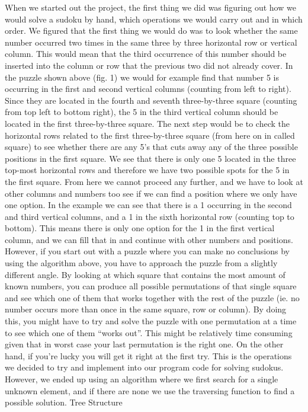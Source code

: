\documentclass[12pt, a4paper]{report}
\begin{document}
When we started out the project, the first thing we did was figuring out how we would solve a sudoku by hand, which operations we would carry out and in which order. We figured that the first thing we would do was to look whether the same number occurred two times in the same three by three horizontal row or vertical column. This would mean that the third occurrence of this number should be inserted into the column or row that the previous two did not already cover. 
In the puzzle shown above (fig. 1) we would for example find that number 5 is occurring in the first and second vertical columns (counting from left to right). Since they are located in the fourth and seventh three-by-three square (counting from top left to bottom right), the 5 in the third vertical column should be located in the first three-by-three square.  
The next step would be to check the horizontal rows related to the first three-by-three   square (from here on in called square) to see whether there are any 5’s that cuts away any of the three possible positions in the first square. We see that there is only one 5 located in the three top-most horizontal rows and therefore we have two possible spots for the 5 in the first square. From here we cannot proceed any further, and we have to look at other columns and numbers too see if we can find a position where we only have one option. 
In the example we can see that there is a 1 occurring in the second and third vertical columns, and a 1 in the sixth horizontal row (counting top to bottom). This means there is only one option for the 1 in the first vertical column, and we can fill that in and continue with other numbers and positions.
However, if you start out with a puzzle where you can make no conclusions by using the algorithm above, you have to approach the puzzle from a slightly different angle. By looking at which square that contains the most amount of known numbers, you can produce all possible permutations of that single square and see which one of them that works together with the rest of the puzzle (ie. no number occurs more than once in the same square, row or column). By doing this, you might have to try and solve the puzzle with one permutation at a time to see which one of them “works out”. This might be relatively time consuming given that in worst case your last permutation is the right one. On the other hand, if you’re lucky you will get it right at the first try.
This is the operations we decided to try and implement into our program code for solving sudokus. However, we ended up using an algorithm where we first search for a single unknown element, and if there are none we use the traversing function to find a possible solution.
Tree Structure
\end{document}
